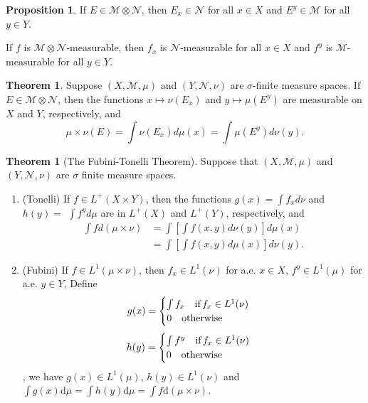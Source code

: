 \documentclass[12pt,a4paper]{book}
\newenvironment{enu}{\begin{enumerate}[(1)]}{\end{enumerate}}
\theoremstyle{definition}
\newtheorem{theo}[defn]{Theorem}
\newtheorem{prop}[defn]{Proposition}
\begin{document}
\begin{prop}
    If $E \in \mathcal{M} \otimes \mathcal{N}$, then $E_x \in \mathcal{N}$ for all $x \in X$ and $E^y \in \mathcal{M}$ for all $y \in Y$.

    If $f$ is $\mathcal{M} \otimes \mathcal{N}$-measurable, then $f_x$ is $\mathcal{N}$-measurable for all $x \in X$ and $f^y$ is $\mathcal{M}$-measurable for all $y \in Y$.
\end{prop}
\begin{theo}
    Suppose $(X, \mathcal{M}, \mu)$ and $(Y, \mathcal{N}, \nu)$ are $\sigma$-finite measure spaces. If $E \in \mathcal{M} \otimes \mathcal{N}$, then the functions $x \mapsto \nu\left(E_x\right)$ and $y \mapsto \mu\left(E^y\right)$ are measurable on $X$ and $Y$, respectively, and
    $$
        \mu \times \nu(E)=\int \nu\left(E_x\right) d \mu(x)=\int \mu\left(E^y\right) d \nu(y) .
    $$
\end{theo}
\begin{theo}[The Fubini-Tonelli Theorem]
    Suppose that $(X, \mathcal{M}, \mu)$ and $(Y, \mathcal{N}, \nu)$ are $\sigma$ finite measure spaces.
    \begin{enu}
        \item (Tonelli) If $f \in L^{+}(X \times Y)$, then the functions $g(x)=\int f_x d \nu$ and $h(y)=$ $\int f^y d \mu$ are in $L^{+}(X)$ and $L^{+}(Y)$, respectively, and
        $$
            \begin{aligned}
                \int f d(\mu \times \nu) & =\int\left[\int f(x, y) d \nu(y)\right] d \mu(x)   \\
                                         & =\int\left[\int f(x, y) d \mu(x)\right] d \nu(y) .
            \end{aligned}
        $$
        \item (Fubini) If $f \in L^1(\mu \times \nu)$, then $f_x \in L^1(\nu)$ for a.e. $x \in X$, $f^y \in L^1(\mu)$ for a.e. $y \in Y$,
        Define
        \begin{equation*}
            g(x)=\begin{cases}
                \int f_x \quad \text{if\,} f_x\in L^1(\nu) \\
                0  \text{\quad otherwise}
            \end{cases}
        \end{equation*}
        \begin{equation*}
            h(y)=\begin{cases}
                \int f^y \quad \text{if\,} f_x\in L^1(\nu) \\
                0  \text{\quad otherwise}
            \end{cases}
        \end{equation*}, we have $g(x)\in L^1(\mu)$, $h(y)\in L^1(\nu)$ and $\int g(x)\text{d}\mu=\int h(y)\text{d}\mu=\int f \text{d}(\mu\times \nu)$.
    \end{enu}
\end{theo}
\end{document}
